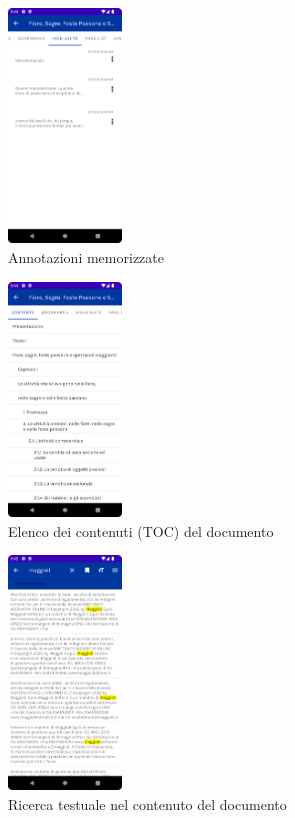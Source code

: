 \begin{multicols}{3}
            \begin{figure}[H]
                \centering
                \includegraphics[width=0.27\textwidth]{img/annotation2.png}
                \caption{Annotazioni memorizzate}
                \label{annotation2-android}
            \end{figure}

            \begin{figure}[H]
                \centering
                \includegraphics[width=0.27\textwidth]{img/toc.png}
                \caption{Elenco dei contenuti (TOC) del documento}
                \label{toc-android}
            \end{figure}
            
            \begin{figure}[H]
                \centering
                \includegraphics[width=0.27\textwidth]{img/ricerca_testo.png}
                \caption{Ricerca testuale nel contenuto del documento}
                \label{ricerca_testo-android}
            \end{figure}
            

\end{multicols}
